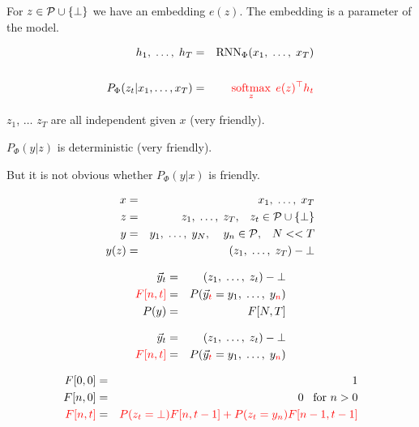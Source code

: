 {

For $z \in {\cal P} \cup \{\bot\}$ we have an embedding $e(z)$.  The embedding is a parameter of the model.

\begin{eqnarray*}
  h_1,\;\ldots,\;h_T & = & \mathrm{RNN}_\Phi(x_1,\;\ldots,\;x_T) \\
  \\
  P_\Phi(z_t|x_1,\ldots,x_T) & = & {\color{red} \operatorname*{softmax}_{z} \;e(z)^\top h_t}
\end{eqnarray*}

\vfill
$z_1$, $\ldots$ $z_T$ are {\color{red}  all independent} given $x$ (very friendly).

\vfill
$P_\Phi(y|z)$ is {\color{red} deterministic} (very friendly).

\vfill
{\color{red} But it is not obvious whether $P_\Phi(y|x)$ is friendly.}


\begin{eqnarray*}
  x & = & x_1,\;\ldots,\; x_T \\
  z & = & z_1, \;\ldots,\;z_T,\;\;\;z_t \in {\cal P}\cup \{\bot\} \\
  y & = & y_1,\;\ldots,\;y_N,\;\;\;\;y_n \in {\cal P},\;\;\;N << T \\
  y(z) & = & (z_1,\;\ldots,\;z_T) - \bot
\end{eqnarray*}

\vfill

\begin{eqnarray*}
  \vec{y}_t & = & (z_1,\;\ldots,\;z_t)-\bot \\
  {\color{red} F[n,t]} & = & P(\vec{y}_{\color{red} t} = y_1,\;\ldots,\;y_{\color{red} n}) \\
  P(y) & = & F[N,T]
\end{eqnarray*}


\begin{eqnarray*}
  \vec{y}_t & = & (z_1,\;\ldots,\;z_t)-\bot \\
  {\color{red} F[n,t]} & = & P(\vec{y}_{\color{red} t} = y_1,\;\ldots,\;y_{\color{red} n}) \\
\end{eqnarray*}

\begin{eqnarray*}
  F[0,0] & = & 1 \\
  F[n,0] & = & 0 \;\;\;\mbox{for $n > 0$} \\
  {\color{red} F[n,t]} & = & {\color{red} P(z_t = \bot) F[n,t-1] + P(z_t = y_n)F[n-1,t-1]}
\end{eqnarray*}

}
